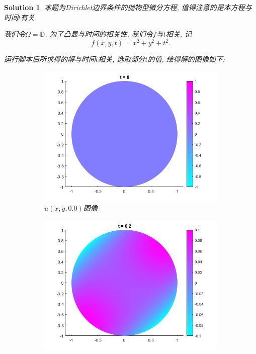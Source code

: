 \documentclass[a4paper, 12pt]{ctexart}
\theoremstyle{plain}
\theoremstyle{plain}
\theoremstyle{plain}
\theoremstyle{nonumberplain}
\newtheorem{solution}{Solution}
\begin{document}
    \begin{solution}
        本题为Dirichlet边界条件的抛物型微分方程, 值得注意的是本方程与时间$t$有关.

        我们令$\Omega=\mathbb{D}$, 为了凸显与时间的相关性, 我们令$f$与$t$相关, 记
        \begin{equation}
            f(x,y,t) = x^{2}+y^{2}+t^{2}.
        \end{equation}

        运行脚本后所求得的解与时间$t$相关, 选取部分$t$的值, 绘得解的图像如下:
        \begin{figure}[H]
            \begin{subfigure}[b]{0.30\textwidth}
                \centering
                \includegraphics[width=\textwidth]{wc22.png}
                \caption{$u(x,y,0.0)$图像}
            \end{subfigure}
            \hfill
            \begin{subfigure}[b]{0.30\textwidth}
                \centering
                \includegraphics[width=\textwidth]{wc23.png}

\end{subfigure}
\end{figure}
\end{solution}
\end{document}
